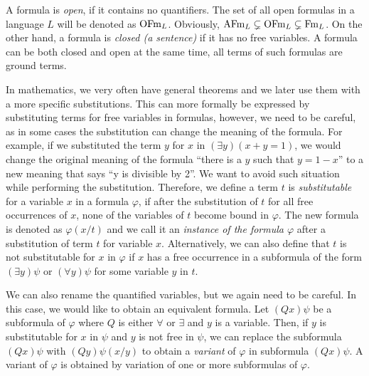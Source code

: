 A formula is \emph{open}, if it contains no quantifiers. The set of all open formulas in a language $L$ will be denoted as $\operatorname{OFm}_L$. Obviously, $\operatorname{AFm}_L \subsetneq \operatorname{OFm}_L \subsetneq \operatorname{Fm}_L$. On the other hand, a formula is \emph{closed (a sentence)} if it has no free variables. A formula can be both closed and open at the same time, all terms of such formulas are ground terms.

In mathematics, we very often have general theorems and we later use them with a more specific substitutions. This can more formally be expressed by substituting terms for free variables in formulas, however, we need to be careful, as in some cases the substitution can change the meaning of the formula. For example, if we substituted the term $y$ for $x$ in $(\exists y) (x+y=1)$, we would change the original meaning of the formula ``there is a $y$ such that $y = 1-x$'' to a new meaning that says ``y is divisible by 2''. We want to avoid such situation while performing the substitution. Therefore, we define a term $t$ is \emph{substitutable} for a variable $x$ in a formula $\varphi$, if after the substitution of $t$ for all free occurrences of $x$, none of the variables of $t$ become bound in $\varphi$. The new formula is denoted as $\varphi(x/t)$ and we call it an \emph{instance of the formula $\varphi$} after a substitution of term $t$ for variable $x$. Alternatively, we can also define that $t$ is not substitutable for $x$ in $\varphi$ if $x$ has a free occurrence in a subformula of the form $(\exists y)\psi$ or $(\forall y) \psi$ for some variable $y$ in $t$.

We can also rename the quantified variables, but we again need to be careful. In this case, we would like to obtain an equivalent formula. Let $(Qx)\psi$ be a subformula of $\varphi$ where $Q$ is either $\forall$ or $\exists$ and $y$ is a variable. Then, if $y$ is substitutable for $x$ in $\psi$ and $y$ is not free in $\psi$, we can replace the subformula $(Qx)\psi$ with $(Qy)\psi(x/y)$ to obtain a \emph{variant} of $\varphi$ in subformula $(Qx)\psi$. A variant of $\varphi$ is obtained by variation of one or more subformulas of $\varphi$.


